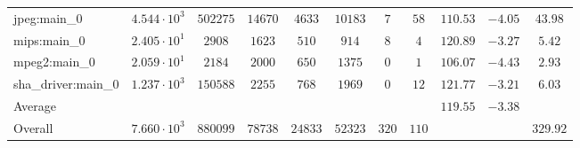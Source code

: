 \begin{tabular}{|l|c|c|c|c|c|c|c|c|c|c|}
jpeg:main\_0            & $ 4.544 \cdot 10^{3} $ & $ 502275 $ & $ 14670 $ & $ 4633  $ & $ 10183 $ & $ 7   $ & $ 58  $ & $ 110.53      $ & $ -4.05   $ & $ 43.98   $ \\
mips:main\_0            & $ 2.405 \cdot 10^{1} $ & $ 2908   $ & $ 1623  $ & $ 510   $ & $ 914   $ & $ 8   $ & $ 4   $ & $ 120.89      $ & $ -3.27   $ & $ 5.42    $ \\
mpeg2:main\_0           & $ 2.059 \cdot 10^{1} $ & $ 2184   $ & $ 2000  $ & $ 650   $ & $ 1375  $ & $ 0   $ & $ 1   $ & $ 106.07      $ & $ -4.43   $ & $ 2.93    $ \\
sha\_driver:main\_0     & $ 1.237 \cdot 10^{3} $ & $ 150588 $ & $ 2255  $ & $ 768   $ & $ 1969  $ & $ 0   $ & $ 12  $ & $ 121.77      $ & $ -3.21   $ & $ 6.03    $ \\
\hline
Average                 & $                    $ & $        $ & $       $ & $       $ & $       $ & $     $ & $     $ & $ 119.55      $ & $ -3.38   $ & $         $ \\
\hline
Overall                 & $ 7.660 \cdot 10^{3} $ & $ 880099 $ & $ 78738 $ & $ 24833 $ & $ 52323 $ & $ 320 $ & $ 110 $ & $             $ & $         $ & $ 329.92  $ \\
\hline
\end{tabular}
